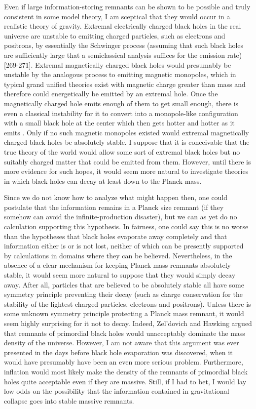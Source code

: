      Even if large information-storing remnants can be shown to be
possible and
truly consistent in some model theory, I am sceptical that they would
occur in
a realistic theory of gravity.  Extremal electrically charged black
holes in
the real universe are unstable to emitting charged particles, such as
electrons
and positrons, by essentially the Schwinger process \cite{Sch51}
(assuming
that
such black holes are sufficiently large that a semiclassical analysis
suffices
for the emission rate) [269-271].  Extremal magnetically
charged
black holes would presumably be unstable by the analogous process
\cite{Aff81}
to emitting magnetic monopoles, which in typical grand unified
theories exist
with magnetic charge greater than mass and therefore could
energetically be
emitted by an extremal hole.  Once the magnetically charged hole
emits enough
of them to get small enough, there is even a classical instability
for it to
convert into a monopole-like configuration with a small black hole at
the
center which then gets hotter and hotter as it emits
\cite{LNW1,LNW2}. Only
if
no such magnetic monopoles existed would extremal magnetically
charged black
holes be absolutely stable.  I suppose that it is conceivable that
the true
theory of the world would allow some sort of extremal black holes but
no
suitably charged matter that could be emitted from them.  However,
until there
is more evidence for such hopes, it would seem more natural to
investigate theories in which black holes can decay at least down to
the Planck
mass.

     Since we do not know how to analyze what might happen then, one
could
postulate that the information remains in a Planck size remnant (if
they
somehow can avoid the infinite-production disaster), but we can as
yet do no
calculation supporting this hypothesis.  In fairness, one could say
this is no
worse than the hypotheses that black holes evaporate away completely
and that
information either is or is not lost, neither of which can be
presently
supported by calculations in domains where they can be believed.
Nevertheless,
in the absence of a clear mechanism for keeping Planck mass remnants
absolutely
stable, it would seem more natural to suppose that they would simply
decay
away.  After all, particles that are believed
to be absolutely stable all have some symmetry principle preventing
their decay
(such as charge conservation for the stability of the lightest
charged
particles, electrons and positrons).  Unless there is some unknown
symmetry
principle protecting a Planck mass remnant, it would seem highly
surprising for
it not to decay.  Indeed, Zel'dovich \cite{Zel77a} and Hawking
\cite{Haw82}
argued that remnants of primordial black holes would unacceptably
dominate
the mass density of the universe. However, I am not aware that this
argument
was ever presented in the days before black hole evaporation was
discovered,
when it would have presumably have been an even more serious problem.
Furthermore, inflation would most likely make the density of the
remnants
of primordial black holes quite acceptable even if they are massive.
Still, if I had to bet, I would lay low odds on the possibility that
the
information
contained in gravitational collapse goes into stable massive
remnants.

